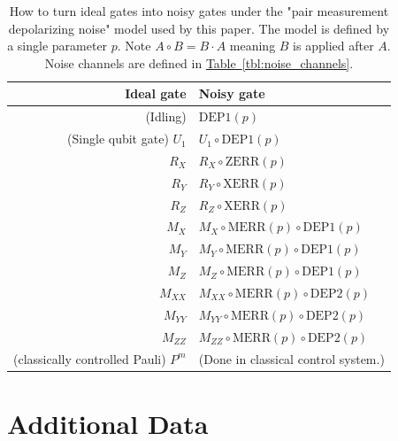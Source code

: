 \documentclass[onecolumn,unpublished,a4paper]{quantumarticle}
\theoremstyle{definition}
\theoremstyle{definition}
\theoremstyle{definition}
\newcommand{\tbl}[1]{\hyperref[tbl:#1]{Table~\ref*{tbl:#1}}}
\begin{document}
\begin{table}[h!]
    \centering
    \begin{tabular}{|r|l|}
    \hline
    Ideal gate & Noisy gate
    \\
    \hline
    (Idling) & $\text{DEP1}(p)$
    \\
    (Single qubit gate) $U_1$ & $U_1 \circ \text{DEP1}(p)$
    \\
    \hline
    $R_X$ & $R_X \circ \text{ZERR}(p)$
    \\
    $R_Y$ & $R_Y \circ \text{XERR}(p)$
    \\
    $R_Z$ & $R_Z \circ \text{XERR}(p)$
    \\
    \hline
    $M_X$ & $M_X \circ \text{MERR}(p) \circ \text{DEP1}(p)$
    \\
    $M_Y$ & $M_Y \circ \text{MERR}(p) \circ \text{DEP1}(p)$
    \\
    $M_Z$ & $M_Z \circ \text{MERR}(p) \circ \text{DEP1}(p)$
    \\
    \hline
    $M_{XX}$ & $M_{XX} \circ \text{MERR}(p) \circ \text{DEP2}(p)$
    \\
    $M_{YY}$ & $M_{YY} \circ \text{MERR}(p) \circ \text{DEP2}(p)$
    \\
    $M_{ZZ}$ & $M_{ZZ} \circ \text{MERR}(p) \circ \text{DEP2}(p)$
    \\
    \hline
    (classically controlled Pauli) $P^m$ & (Done in classical control system.)
    \\
    \hline
    \end{tabular}
    \caption{
        How to turn ideal gates into noisy gates under the "pair measurement depolarizing noise" model used by this paper.
        The model is defined by a single parameter $p$.
        Note $A \circ B = B \cdot A$ meaning $B$ is applied after $A$.
        Noise channels are defined in \tbl{noise_channels}.
    }
    \label{tbl:noise_model}
\end{table}

\clearpage
\section{Additional Data}
\label{app:other_plots}
\end{document}
